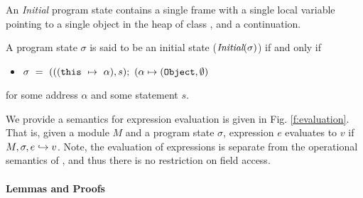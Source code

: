 An \emph{Initial} program state contains a single frame 
with a single local variable  pointing to a single object 
in the heap of class , and a continuation.
\begin{definition}
\label{def:initial}
A program state $\sigma$ is said to be an initial state ($\textit{Initial}(\sigma)$)
if and only if
\begin{itemize}
\item
$\sigma\ =\  ( ((\prg{this}\ \mapsto\ \alpha), s); \  (\alpha \mapsto (\prg{Object}, \emptyset)$
\end{itemize} 
for some address $\alpha$ and some statement $s$.
\end{definition}



We provide a semantics for expression evaluation is given in Fig. \ref{f:evaluation}. 
That is, given a module $M$ and a program state $\sigma$, expression $e$ evaluates to $v$
if $M, \sigma, e \hookrightarrow v$. Note, the evaluation of expressions is separate from the operational
semantics of \LangOO, and thus there is no restriction on field access.

{
\paragraph{Lemmas and Proofs}
}

